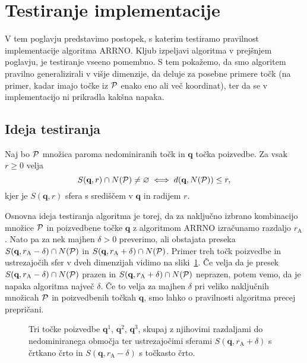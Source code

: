 \section{Testiranje implementacije}
\label{sec:analiza_pravilnosti}
V tem poglavju predstavimo postopek, s katerim testiramo pravilnost implementacije algoritma ARRNO. Kljub izpeljavi algoritma v prejšnjem poglavju, je testiranje vseeno pomembno. S tem pokažemo, da smo algoritem pravilno generalizirali v višje dimenzije, da deluje za posebne primere točk (na primer, kadar imajo točke iz $\P$ enako eno ali več koordinat), ter da se v implementacijo ni prikradla kakšna napaka. 

\subsection{Ideja testiranja}
Naj bo $\P$ množica paroma nedominiranih točk in $\textbf{q}$ točka poizvedbe. Za vsak $r \geq 0$ velja
\[
S(\textbf{q}, r) \cap N(\P) \neq \varnothing \iff d(\textbf{q}, N(\P)) \leq r,
\]
kjer je $S(\textbf{q}, r)$ sfera s središčem v $\textbf{q}$ in radijem $r$.


Osnovna ideja testiranja algoritma je torej, da za naključno izbrano kombinacijo množice $\P$ in poizvedbene točke $\textbf{q}$ z algoritmom ARRNO izračunamo razdaljo $r_\text{A}$. Nato pa za nek majhen $\delta > 0$ preverimo, ali obstajata preseka $S(\textbf{q}, r_\text{A} - \delta) \cap N(\P)$ in $S(\textbf{q}, r_\text{A} + \delta) \cap N(\P)$. Primer treh točk poizvedbe in ustrezajočih sfer v dveh dimenzijah vidimo na sliki~\ref{fig:test_example}. Če velja da je presek $S(\textbf{q}, r_\text{A} - \delta) \cap N(\P)$ prazen in $S(\textbf{q}, r_\text{A} + \delta) \cap N(\P)$ neprazen, potem vemo, da je napaka algoritma največ $\delta$. Če to velja za majhen $\delta$ pri veliko naključnih množicah $\P$ in poizvedbenih točkah $\textbf{q}$, smo lahko o pravilnosti algoritma precej prepričani. 
\begin{figure}[ht]
  \centering
  
  \caption{Tri točke poizvedbe $\textbf{q}^1$, $\textbf{q}^2$, $\textbf{q}^3$, skupaj z njihovimi razdaljami do nedominiranega območja ter ustrezajočimi sferami $S(\textbf{q}, r_\text{A} + \delta)$ s črtkano črto in $S(\textbf{q}, r_\text{A} - \delta)$ s točkasto črto.}
  \label{fig:test_example}
\end{figure}


